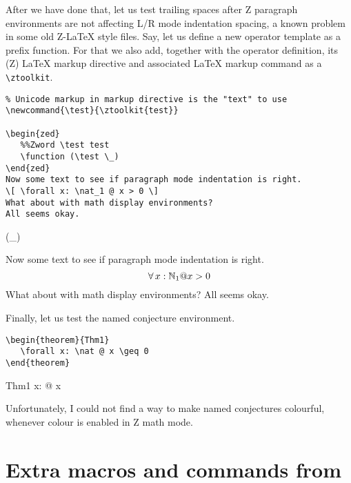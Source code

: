 \documentclass{article}
\def\gives{\endquote\endgroup\egroup}
\begin{document}
After we have done that, let us test trailing spaces after Z paragraph environments are not
affecting L/R mode indentation spacing, a known problem in some old Z-\LaTeX{} style files.
Say, let us define a new operator template as a prefix function. For that we also add,
together with the operator definition, its (Z) \LaTeX{} markup directive and associated
\LaTeX{} markup command as a \verb|\ztoolkit|.
%
\begin{demo}
\begin{verbatim}
% Unicode markup in markup directive is the "text" to use
\newcommand{\test}{\ztoolkit{test}}

\begin{zed}
   %%Zword \test test
   \function (\test \_)
\end{zed}
Now some text to see if paragraph mode indentation is right.
\[ \forall x: \nat_1 @ x > 0 \]
What about with math display environments?
All seems okay.
\end{verbatim}
\gives
\newcommand{\test}{}

\begin{zed}
   \function (\test \_)
\end{zed}
Now some text to see if paragraph mode indentation is right.
\[ \forall x: \nat_1 @ x > 0 \]
What about with math display environments? All seems okay.
\end{demo}
%
Finally, let us test the named conjecture environment.
%
\begin{demo}
\begin{verbatim}
\begin{theorem}{Thm1}
   \forall x: \nat @ x \geq 0
\end{theorem}
\end{verbatim}
\gives
\begin{theorem}{Thm1}
   \forall x: \nat @ x 
\end{theorem}
\end{demo}
%
Unfortunately, I could not find a way to make named conjectures
colourful, whenever colour is enabled in Z math mode.

\section{Extra macros and commands from \cztstylefile}\label{sec:cztsty}
\end{document}
